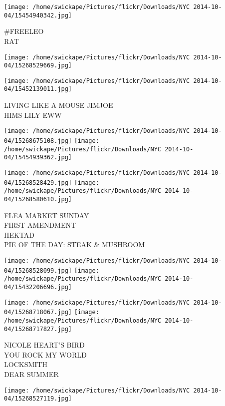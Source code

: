 \documentclass[10pt,letterpaper]{article}
\begin{document}
\vspace{0.25in}
\texttt{[image: /home/swickape/Pictures/flickr/Downloads/NYC 2014-10-04/15454940342.jpg]}

\#FREELEO\\
RAT\\
\pagebreak

\texttt{[image: /home/swickape/Pictures/flickr/Downloads/NYC 2014-10-04/15268529669.jpg]}

\vspace{0.25in}
\texttt{[image: /home/swickape/Pictures/flickr/Downloads/NYC 2014-10-04/15452139011.jpg]}

LIVING LIKE A MOUSE JIMJOE\\
HIMS LILY EWW\\
\pagebreak

\texttt{[image: /home/swickape/Pictures/flickr/Downloads/NYC 2014-10-04/15268675108.jpg]}
\texttt{[image: /home/swickape/Pictures/flickr/Downloads/NYC 2014-10-04/15454939362.jpg]}

\texttt{[image: /home/swickape/Pictures/flickr/Downloads/NYC 2014-10-04/15268528429.jpg]}
\texttt{[image: /home/swickape/Pictures/flickr/Downloads/NYC 2014-10-04/15268580610.jpg]}

FLEA MARKET SUNDAY\\
FIRST AMENDMENT\\
HEKTAD\\
PIE OF THE DAY: STEAK \& MUSHROOM\\
\pagebreak

\texttt{[image: /home/swickape/Pictures/flickr/Downloads/NYC 2014-10-04/15268528099.jpg]}
\texttt{[image: /home/swickape/Pictures/flickr/Downloads/NYC 2014-10-04/15432206696.jpg]}

\texttt{[image: /home/swickape/Pictures/flickr/Downloads/NYC 2014-10-04/15268718067.jpg]}
\texttt{[image: /home/swickape/Pictures/flickr/Downloads/NYC 2014-10-04/15268717827.jpg]}

NICOLE HEART'S BIRD\\
YOU ROCK MY WORLD\\
LOCKSMITH\\
DEAR SUMMER\\
\pagebreak

\texttt{[image: /home/swickape/Pictures/flickr/Downloads/NYC 2014-10-04/15268527119.jpg]}
\end{document}

